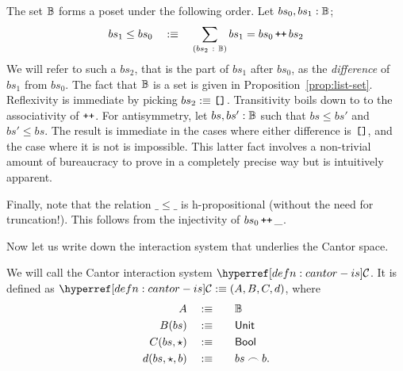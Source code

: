 \begin{defn}\label{defn:cantor-poset}
  The set $\mathbb{B}{}$ forms a poset under the following order. Let
  $bs_0, bs_1:\mathbb{B}{}$;
  \begin{equation*}
    bs_1 \le bs_0 \quad:\equiv\quad \sum_{(bs_2~:~\mathbb{B}{})} bs_1 = bs_0 \operatorname{\textnormal{\texttt{++}}} bs_2
  \end{equation*}
  We will refer to such a $bs_2$, that is the part of $bs_1$ after $bs_0$, as the
  \emph{difference} of $bs_1$ from $bs_0$. The fact that $\mathbb{B}{}$ is a set is
  given in Proposition~\ref{prop:list-set}. Reflexivity is immediate by picking $bs_2 :\equiv
  \text{\texttt{[]}}{}$. Transitivity boils down to to the associativity of $\operatorname{\textnormal{\texttt{++}}}$. For
  antisymmetry, let $bs, bs':\mathbb{B}{}$ such that $bs \le bs'$ and $bs' \le
  bs$. The result is immediate in the cases where either difference is $\text{\texttt{[]}}$, and
  the case where it is not is impossible. This latter fact involves a non-trivial amount
  of bureaucracy to prove in a completely precise way but is intuitively apparent.

  Finally, note that the relation $\_\le\_$ is h-propositional (without the need for
  truncation!). This follows from the injectivity of $bs_0 \operatorname{\textnormal{\texttt{++}}} \_$.
\end{defn}

Now let us write down the interaction system that underlies the Cantor space.
\begin{defn}\label{defn:cantor-is}
  We will call the Cantor interaction system $\cantoris{}$. It is defined as
  $\cantoris{} \is (A, B, C, d)$, where
  \begin{alignat*}{2}
    A           \quad&:\equiv\quad && \mathbb{B}{} \\
    B(bs)       \quad&:\equiv\quad && \mathsf{Unit}{}  \\
    C(bs, \star)    \quad&:\equiv\quad && \mathsf{Bool}{}    \\
    d(bs, \star, b) \quad&:\equiv\quad && bs \frown b     .
  \end{alignat*}
\end{defn}

